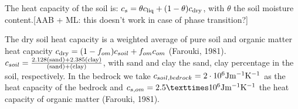 \documentclass{article}
\begin{document}
The heat capacity of the soil is:
$c_s=\theta c_{\rm liq} + (1-\theta) c_{\rm dry}$, with $\theta$ the soil moisture content.[AAB + ML: this doesn't work in case of phase transition?]


The dry soil heat capacity is a weighted average of pure soil and organic matter heat capacity $c_{\rm dry} = (1-f_{om})c_{soil} + f_{om}c_{om}$ (Farouki, 1981).
$c_{soil} = {\rm \frac{2.128 (sand)+ 2.385 (clay)}{(sand) + (clay)}}$, with sand and clay the sand, clay percentage in the soil, respectively.
In the bedrock we take $c_{soil,bedrock} = 2 \cdot 10^6 {\rm J m^{-1} K^{-1}}$ as the heat capacity of the bedrock and $c_{s,om} = 2.5 ×10^6 {\rm J m^{-1} K^{-1}}$ the heat capacity of organic matter (Farouki, 1981).

\begin{table}[]
\end{table}
\end{document}

